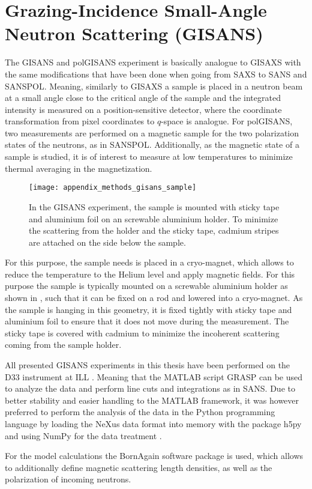 \documentclass[\main/dresen_thesis.tex]{subfiles}
\begin{document}
  \section{Grazing-Incidence Small-Angle Neutron Scattering (GISANS)}
    \label{ch:methods:gisans}
    The GISANS and polGISANS experiment is basically analogue to GISAXS with the same modifications that have been done when going from SAXS to SANS and SANSPOL.
    Meaning, similarly to GISAXS a sample is placed in a neutron beam at a small angle close to the critical angle of the sample and the integrated intensity is measured on a position-sensitive detector, where the coordinate transformation from pixel coordinates to $q$-space is analogue.
    For polGISANS, two measurements are performed on a magnetic sample for the two polarization states of the neutrons, as in SANSPOL.
    Additionally, as the magnetic state of a sample is studied, it is of interest to measure at low temperatures to minimize thermal averaging in the magnetization.

    \begin{figure}[tb]
      \centering
      \texttt{[image: appendix\_methods\_gisans\_sample]}
      \caption{\label{fig:methods:gisans:samples}In the GISANS experiment, the sample is mounted with sticky tape and aluminium foil on an screwable aluminium holder. To minimize the scattering from the holder and the sticky tape, cadmium stripes are attached on the side below the sample.}
    \end{figure}

    For this purpose, the sample needs is placed in a cryo-magnet, which allows to reduce the temperature to the Helium level and apply magnetic fields.
    For this purpose the sample is typically mounted on a screwable aluminium holder as shown in , such that it can be fixed on a rod and lowered into a cryo-magnet.
    As the sample is hanging in this geometry, it is fixed tightly with sticky tape and aluminium foil to ensure that it does not move during the measurement.
    The sticky tape is covered with cadmium to minimize the incoherent scattering coming from the sample holder.

    All presented GISANS experiments in this thesis have been performed on the D33 instrument at ILL .
    Meaning that the MATLAB script GRASP can be used to analyze the data and perform line cuts and integrations as in SANS.
    Due to better stability and easier handling to the MATLAB framework, it was however preferred to perform the analysis of the data in the Python programming language by loading the NeXus data format into memory with the package h5py \cite{collette_2013_h5py} and using NumPy for the data treatment \cite{Oliphant_2006_Guide}.

    For the model calculations the BornAgain software package is used, which allows to additionally define magnetic scattering length densities, as well as the polarization of incoming neutrons.
\end{document}
